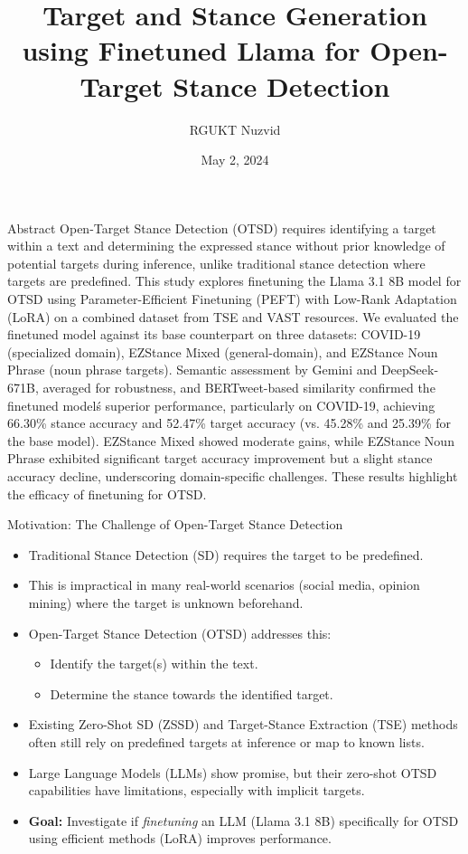 \documentclass{beamer}
\title[OTSD with Finetuned Llama]{Target and Stance Generation using Finetuned Llama for Open-Target Stance Detection}
\author{RGUKT Nuzvid} %
\date{May 2, 2024} %
\begin{document}
\begin{frame}
  \titlepage
\end{frame}

\begin{frame}{Abstract}
  \tiny %
  Open-Target Stance Detection (OTSD) requires identifying a target within a text and determining the expressed stance without prior knowledge of potential targets during inference, unlike traditional stance detection where targets are predefined. This study explores finetuning the Llama 3.1 8B model for OTSD using Parameter-Efficient Finetuning (PEFT) with Low-Rank Adaptation (LoRA) on a combined dataset from TSE and VAST resources. We evaluated the finetuned model against its base counterpart on three datasets: COVID-19 (specialized domain), EZStance Mixed (general-domain), and EZStance Noun Phrase (noun phrase targets). Semantic assessment by Gemini and DeepSeek-671B, averaged for robustness, and BERTweet-based similarity confirmed the finetuned model\'s superior performance, particularly on COVID-19, achieving 66.30\% stance accuracy and 52.47\% target accuracy (vs. 45.28\% and 25.39\% for the base model). EZStance Mixed showed moderate gains, while EZStance Noun Phrase exhibited significant target accuracy improvement but a slight stance accuracy decline, underscoring domain-specific challenges. These results highlight the efficacy of finetuning for OTSD.
\end{frame}

\begin{frame}{Motivation: The Challenge of Open-Target Stance Detection}
  \begin{itemize}
    \item Traditional Stance Detection (SD) requires the target to be predefined.
    \item This is impractical in many real-world scenarios (social media, opinion mining) where the target is unknown beforehand.
    \item Open-Target Stance Detection (OTSD) addresses this:
          \begin{itemize}
            \item Identify the target(s) within the text.
            \item Determine the stance towards the identified target.
          \end{itemize}
    \item Existing Zero-Shot SD (ZSSD) and Target-Stance Extraction (TSE) methods often still rely on predefined targets at inference or map to known lists.
    \item Large Language Models (LLMs) show promise, but their zero-shot OTSD capabilities have limitations, especially with implicit targets.
    \item \textbf{Goal:} Investigate if \textit{finetuning} an LLM (Llama 3.1 8B) specifically for OTSD using efficient methods (LoRA) improves performance.
  \end{itemize}
\end{frame}
\end{document}
